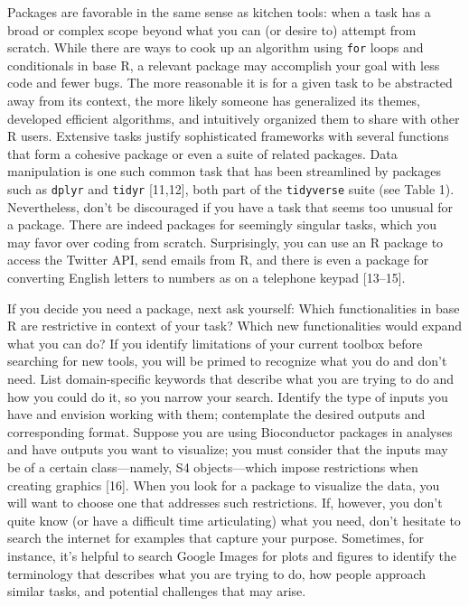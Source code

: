 \documentclass[10pt,letterpaper]{article}
\begin{document}
Packages are favorable in the same sense as kitchen tools: when a task
has a broad or complex scope beyond what you can (or desire to) attempt
from scratch. While there are ways to cook up an algorithm using
\texttt{for} loops and conditionals in base R, a relevant package may
accomplish your goal with less code and fewer bugs. The more reasonable
it is for a given task to be abstracted away from its context, the more
likely someone has generalized its themes, developed efficient
algorithms, and intuitively organized them to share with other R users.
Extensive tasks justify sophisticated frameworks with several functions
that form a cohesive package or even a suite of related packages. Data
manipulation is one such common task that has been streamlined by
packages such as \texttt{dplyr} and \texttt{tidyr} {[}11,12{]}, both
part of the \texttt{tidyverse} suite (see Table 1). Nevertheless, don't
be discouraged if you have a task that seems too unusual for a package.
There are indeed packages for seemingly singular tasks, which you may
favor over coding from scratch. Surprisingly, you can use an R package
to access the Twitter API, send emails from R, and there is even a
package for converting English letters to numbers as on a telephone
keypad {[}13--15{]}.

If you decide you need a package, next ask yourself: Which
functionalities in base R are restrictive in context of your task? Which
new functionalities would expand what you can do? If you identify
limitations of your current toolbox before searching for new tools, you
will be primed to recognize what you do and don't need. List
domain-specific keywords that describe what you are trying to do and how
you could do it, so you narrow your search. Identify the type of inputs
you have and envision working with them; contemplate the desired outputs
and corresponding format. Suppose you are using Bioconductor packages in
analyses and have outputs you want to visualize; you must consider that
the inputs may be of a certain class---namely, S4 objects---which impose
restrictions when creating graphics {[}16{]}. When you look for a
package to visualize the data, you will want to choose one that
addresses such restrictions. If, however, you don't quite know (or have
a difficult time articulating) what you need, don't hesitate to search
the internet for examples that capture your purpose. Sometimes, for
instance, it's helpful to search Google Images for plots and figures to
identify the terminology that describes what you are trying to do, how
people approach similar tasks, and potential challenges that may arise.
\end{document}
